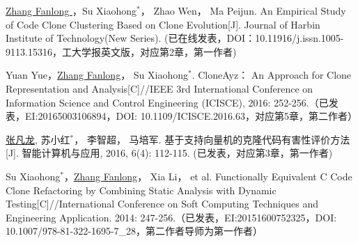 \begin{publist}
\item
\underline{Zhang Fanlong }，Su Xiaohong{$^*$}， Zhao Wen， Ma Peijun. An Empirical Study of Code Clone Clustering Based on Clone Evolution[J]. Journal of Harbin Institute of Technology(New Series). (已在线发表，DOI：10.11916/j.issn.1005-9113.15316，工大学报英文版，对应第2章，第一作者)

\item
Yuan Yue，\underline{Zhang Fanlong}， Su Xiaohong{$^*$}. CloneAyz： An Approach for Clone Representation and Analysis[C]//IEEE 3rd International Conference on Information Science and Control Engineering (ICISCE), 2016: 252-256.（已发表，EI:20165003106894，DOI:	10.1109/ICISCE.2016.63，对应第5章，第二作者）


\item
\underline{张凡龙}, 苏小红{$^*$}， 李智超， 马培军. 基于支持向量机的克隆代码有害性评价方法[J]. 智能计算机与应用, 2016, 6(4): 112-115. (已发表，对应第3章，第一作者)

\item
Su Xiaohong{$^*$}，\underline{Zhang Fanlong}， Xia Li， et al. Functionally Equivalent C Code Clone Refactoring by Combining Static Analysis with Dynamic Testing[C]//International Conference on Soft Computing Techniques and Engineering Application. 2014: 247-256.（已发表，EI:20151600752325，DOI: 10.1007/978-81-322-1695-7\_28，第二作者导师为第一作者）
\end{publist}




